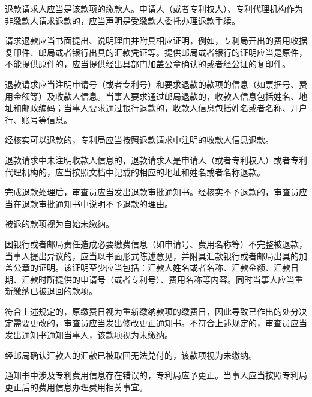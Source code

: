 退款请求人应当是该款项的缴款人。申请人（或者专利权人）、专利代理机构作为非缴款人请求退款的，应当声明是受缴款人委托办理退款手续。

请求退款应当书面提出、说明理由并附具相应证明，例如，专利局开出的费用收据复印件、邮局或者银行出具的汇款凭证等。提供邮局或者银行的证明应当是原件，不能提供原件的，应当提供经出具部门加盖公章确认的或者经公证的复印件。

退款请求应当注明申请号（或者专利号）和要求退款的款项的信息（如票据号、费用金额等）及收款人信息。当事人要求通过邮局退款的，收款人信息包括姓名、地址和邮政编码；当事人要求通过银行退款的，收款人信息包括姓名或者名称、开户行、账号等信息。

经核实可以退款的，专利局应当按照退款请求中注明的收款人信息退款。

退款请求中未注明收款人信息的，退款请求人是申请人（或者专利权人）或者专利代理机构的，应当按照文档中记载的相应的地址和姓名或者名称退款。

完成退款处理后，审查员应当发出退款审批通知书。经核实不予退款的，审查员应当在退款审批通知书中说明不予退款的理由。

被退的款项视为自始未缴纳。

因银行或者邮局责任造成必要缴费信息（如申请号、费用名称等）不完整被退款，当事人提出异议的，应当以书面形式陈述意见，并附具汇款银行或者邮局出具的加盖公章的证明。该证明至少应当包括：汇款人姓名或者名称、汇款金额、汇款日期、汇款时所提供的申请号（或者专利号）、费用名称等内容。同时当事人应当重新缴纳已被退回的款项。

符合上述规定的，原缴费日视为重新缴纳款项的缴费日，因此导致已作出的处分决定需要更改的，审查员应当发出修改更正通知书。不符合上述规定的，审查员应当发出通知书通知当事人，该款项视为未缴纳。

经邮局确认汇款人的汇款已被取回无法兑付的，该款项视为未缴纳。

通知书中涉及专利费用信息存在错误的，专利局应予更正。当事人应当按照专利局更正后的费用信息办理费用相关事宜。

